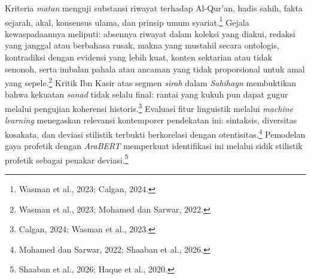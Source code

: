 Kriteria \textit{matan} menguji substansi riwayat terhadap Al-Qur'an, hadis sahih, fakta sejarah, akal, konsensus ulama, dan prinsip umum syariat.\footnote{Wasman et al., 2023; Calgan, 2024.} Gejala kewaspadaannya meliputi: absennya riwayat dalam koleksi yang diakui, redaksi yang janggal atau berbahasa rusak, makna yang mustahil secara ontologis, kontradiksi dengan evidensi yang lebih kuat, konten sektarian atau tidak senonoh, serta imbalan pahala atau ancaman yang tidak proporsional untuk amal yang sepele.\footnote{Wasman et al., 2023; Mohamed dan Sarwar, 2022.} Kritik Ibn Kasir atas segmen \textit{sirah} dalam \textit{Sahihayn} membuktikan bahwa kekuatan \textit{sanad} tidak selalu final: rantai yang kukuh pun dapat gugur melalui pengujian koherensi historis.\footnote{Calgan, 2024; Wasman et al., 2023.} Evaluasi fitur linguistik melalui \textit{machine learning} menegaskan relevansi kontemporer pendekatan ini: sintaksis, diversitas kosakata, dan deviasi stilistik terbukti berkorelasi dengan otentisitas.\footnote{Mohamed dan Sarwar, 2022; Shaaban et al., 2026.} Pemodelan gaya profetik dengan \textit{AraBERT} memperkuat identifikasi ini melalui sidik stilistik profetik sebagai penakar deviasi.\footnote{Shaaban et al., 2026; Haque et al., 2020.}

